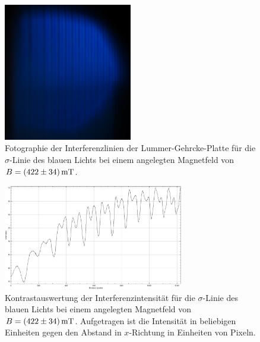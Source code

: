 \begin{figure}
  \centering
  \includegraphics[width=0.5\textwidth]{bilder/3003_BLAU_300mT_sigma.jpg}
  \caption{Fotographie der Interferenzlinien der Lummer-Gehrcke-Platte für die $\sigma$-Linie des blauen Lichts bei einem angelegten Magnetfeld von $B=\SI{422\pm34}{\milli\tesla}$.}
  \label{abb:sigmablau422mT}
\end{figure}
\begin{figure}
  \centering
  \includegraphics[width=0.7\textwidth]{bilder/sigmaBLAU_300mT.PNG}
  \caption{Kontrastauswertung der Interferenzintensität für die $\sigma$-Linie des blauen Lichts bei einem angelegten Magnetfeld von $B=\SI{422\pm34}{\milli\tesla}$. Aufgetragen ist die Intensität in beliebigen Einheiten gegen den Abstand in $x$-Richtung in Einheiten von Pixeln.}
  \label{abb:plotsigmablau422mT}
\end{figure}
\clearpage
